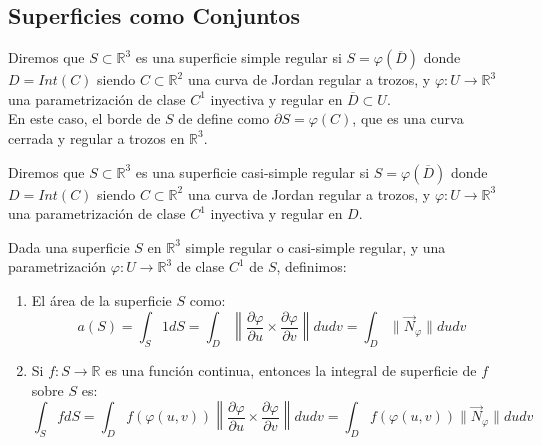 \subsection{Superficies como Conjuntos}

\begin{definición} 
Diremos que $S \subset \mathbb{R}^3$ es una superficie simple regular si $S = \varphi (\overline{D})$ donde $D = Int(C)$ siendo $C \subset \mathbb{R}^2$ una curva de Jordan regular a trozos, y $\varphi: U \to \mathbb{R}^3$ una parametrización de clase $C^1$ inyectiva y regular en $\overline{D} \subset U$.\\
En este caso, el borde de $S$ de define como $ \partial S = \varphi(C)$, que es una curva cerrada y regular a trozos en $\mathbb{R}^3$.
\end{definición}

\begin{definición} 
Diremos que $S \subset \mathbb{R}^3$ es una superficie casi-simple regular si $S = \varphi (\overline{D})$ donde $D = Int(C)$ siendo $C \subset \mathbb{R}^2$ una curva de Jordan regular a trozos, y $\varphi: U \to \mathbb{R}^3$ una parametrización de clase $C^1$ inyectiva y regular en $D$.
\end{definición}

\begin{definición} 
Dada una superficie $S$ en $\mathbb{R}^3$ simple regular o casi-simple regular, y una parametrización $\varphi: U \to \mathbb{R}^3$ de clase $C^1$ de $S$, definimos:
\vspace{-0.5em}
\begin{enumerate}
    \item El área de la superficie $S$ como: $$ a(S) = \int_{S} 1 dS = \int_{D}
              \left\lVert \frac{\partial \varphi}{\partial u} \times \frac{\partial
                  \varphi}{\partial v} \right\rVert dudv = \int_{D} \lVert \vec{N}_\varphi \rVert
              dudv $$
    \item  Si $f: S \to \mathbb{R}$ es una función continua, entonces la integral de
          superficie de $f$ sobre $S$ es: $$ \int_{S} f dS = \int_{D} f(\varphi(u,v))
              \left\lVert \frac{\partial \varphi}{\partial u} \times \frac{\partial
                  \varphi}{\partial v} \right\rVert dudv = \int_{D} f(\varphi(u,v)) \lVert
              \vec{N}_\varphi \rVert dudv $$
\end{enumerate}
\end{definición}

